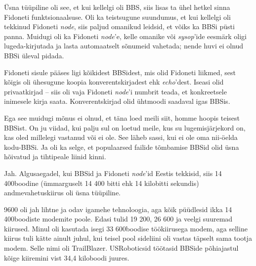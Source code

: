 Üsna tüüpiline oli see, et kui kellelgi oli BBS, siis lisas
ta ühel hetkel sinna Fidoneti funktsionaalsuse. Oli ka teistsugune suundumus, et kui kellelgi oli 
tekkinud Fidoneti \emph{node}, siis paljud omanikud 
leidsid, et võiks ka BBSi püsti panna. 
Muidugi oli ka Fidoneti \emph{node}'e, kelle omanike või 
\emph{sysop}'ide eesmärk oligi lugeda-kirjutada ja lasta automaatselt sõnumeid 
vahetada; nende huvi ei olnud BBSi üleval pidada.


Fidoneti sisule pääses ligi kõikidest BBSidest, mis olid Fidoneti liikmed, sest 
kõigis oli ühesugune koopia konverentskirjadest ehk \emph{echo}'dest. 
Iseasi olid privaatkirjad – siis oli vaja Fidoneti \emph{node}'i numbrit teada, 
et konkreetsele inimesele kirja saata. Konverentskirjad 
olid ühtmoodi saadaval igas BBSis.

Ega see muidugi mõnus ei olnud, et täna loed meili siit, homme hoopis 
teisest BBSist. On ju viidad, kui palju sul on loetud meile, kus 
su lugemisjärjekord on, kas oled millelegi vastanud või ei ole. See läheb 
sassi, kui ei ole oma nii-öelda kodu-BBSi. Ja oli ka selge, et 
populaarsed failide tõmbamise BBSid olid üsna hõivatud ja 
tihtipeale liinid kinni. 


Jah. Algusaegadel, kui BBSid ja Fidoneti \emph{node}'id Eestis tekkisid, 
siis 14 400boodine (ümmarguselt 14 400 
bitti ehk 14 kilobitti sekundis) andmevahetuskiirus oli üsna tüüpiline.


9600 oli jah lihtne ja odav igamehe tehnoloogia, aga kõik püüdlesid ikka 14 400boodiste 
modemite poole. Edasi tulid
19 200, 26 600 ja veelgi suuremad kiirused. Minul oli kasutada isegi
33 600boodise töökiirusega modem, aga selline kiirus tuli 
kätte ainult juhul, kui teisel pool sideliini oli vastas täpselt 
sama tootja modem. Selle nimi oli TrailBlazer. USRoboticsid töötasid BBSide 
põhiajastul kõige kiiremini vist 34,4 kiloboodi juures.

